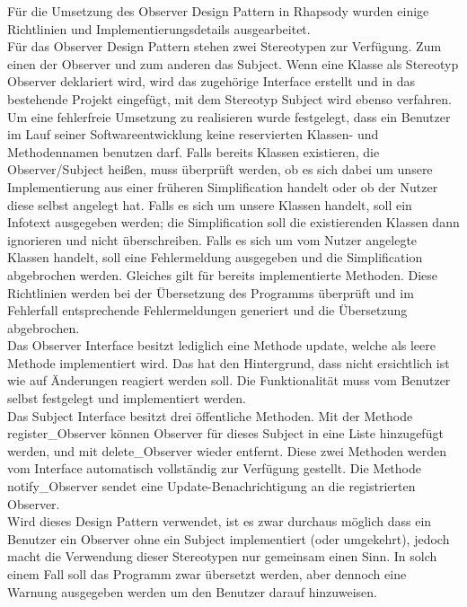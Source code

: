 Für die Umsetzung des Observer Design Pattern in Rhapsody wurden einige Richtlinien und 
Implementierungsdetails ausgearbeitet.\\
\newline
Für das Observer Design Pattern stehen zwei Stereotypen zur Verfügung. Zum einen der Observer 
und zum anderen das Subject. Wenn eine Klasse als Stereotyp Observer deklariert wird, wird das 
zugehörige Interface erstellt und in das bestehende Projekt eingefügt, mit dem Stereotyp Subject 
wird ebenso verfahren.\\
\newline
Um eine fehlerfreie Umsetzung zu realisieren wurde festgelegt, dass ein Benutzer im Lauf seiner 
Softwareentwicklung keine reservierten Klassen- und Methodennamen benutzen darf. Falls bereits Klassen existieren, die Observer/Subject heißen, muss überprüft werden, ob es sich dabei um unsere Implementierung aus einer früheren Simplification handelt oder ob der Nutzer diese selbst angelegt hat. Falls es sich um unsere Klassen handelt, soll ein Infotext ausgegeben werden; die Simplification soll die existierenden Klassen dann ignorieren und nicht überschreiben. Falls es sich um vom Nutzer angelegte Klassen handelt, soll eine Fehlermeldung ausgegeben und die Simplification abgebrochen werden.
Gleiches gilt für bereits implementierte Methoden. 
Diese Richtlinien werden bei der Übersetzung des Programms überprüft und im Fehlerfall 
entsprechende Fehlermeldungen generiert und die Übersetzung abgebrochen.\\
\newline
Das Observer Interface besitzt lediglich eine Methode update, welche als leere Methode 
implementiert wird. Das hat den Hintergrund, dass nicht ersichtlich ist wie auf Änderungen 
reagiert werden soll. Die Funktionalität muss vom Benutzer selbst festgelegt und implementiert 
werden.\\
\newline
Das Subject Interface besitzt drei öffentliche Methoden. Mit der Methode register_Observer 
können Observer für dieses Subject in eine Liste hinzugefügt werden, und mit delete_Observer 
wieder entfernt. Diese zwei Methoden werden vom Interface automatisch vollständig zur Verfügung
gestellt. Die Methode notify_Observer sendet eine Update-Benachrichtigung an die registrierten Observer.\\
\newline
Wird dieses Design Pattern verwendet, ist es zwar durchaus möglich dass ein Benutzer ein 
Observer ohne ein Subject implementiert (oder umgekehrt), jedoch macht die Verwendung 
dieser Stereotypen nur gemeinsam einen Sinn. In solch einem Fall soll das Programm zwar 
übersetzt werden, aber dennoch eine Warnung ausgegeben werden um den Benutzer darauf hinzuweisen.

						
